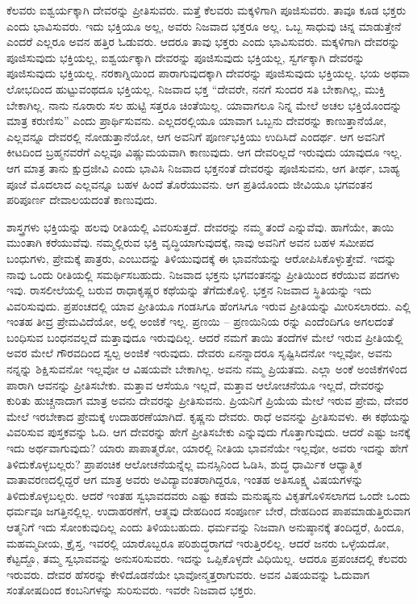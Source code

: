 ಕೆಲವರು ಐಶ್ವರ್ಯಕ್ಕಾಗಿ ದೇವರನ್ನು ಪ್ರೀತಿಸುವರು. ಮತ್ತೆ ಕೆಲವರು ಮಕ್ಕಳಿಗಾಗಿ ಪೂಜಿಸುವರು. ತಾವೂ ಕೂಡ ಭಕ್ತರು ಎಂದು ಭಾವಿಸುವರು. ಇದು ಭಕ್ತಿಯೂ ಅಲ್ಲ, ಅವರು ನಿಜವಾದ ಭಕ್ತರೂ ಅಲ್ಲ. ಒಬ್ಬ ಸಾಧುವು ಚಿನ್ನ ಮಾಡುತ್ತೇನೆ ಎಂದರೆ ಎಲ್ಲರೂ ಅವನ ಹತ್ತಿರ ಓಡುವರು. ಆದರೂ ತಾವು ಭಕ್ತರು ಎಂದು ಭಾವಿಸುವರು. ಮಕ್ಕಳಿಗಾಗಿ ದೇವರನ್ನು ಪೂಜಿಸುವುದು ಭಕ್ತಿಯಲ್ಲ, ಐಶ್ವರ್ಯಕ್ಕಾಗಿ ದೇವರನ್ನು ಪೂಜಿಸುವುದು ಭಕ್ತಿಯಲ್ಲ, ಸ್ವರ್ಗಕ್ಕಾಗಿ ದೇವರನ್ನು ಪೂಜಿಸುವುದು ಭಕ್ತಿಯಲ್ಲ. ನರಕಾಗ್ನಿಯಿಂದ ಪಾರಾಗುವುದಕ್ಕಾಗಿ ದೇವರನ್ನು ಪೂಜಿಸುವುದು ಭಕ್ತಿಯಲ್ಲ. ಭಯ ಅಥವಾ ಲೋಭದಿಂದ ಹುಟ್ಟುವಂಥದೂ ಭಕ್ತಿಯಲ್ಲ. ನಿಜವಾದ ಭಕ್ತ “ದೇವರೇ, ನನಗೆ ಸುಂದರ ಸತಿ ಬೇಕಾಗಿಲ್ಲ, ಮುಕ್ತಿ ಬೇಕಾಗಿಲ್ಲ. ನಾನು ನೂರಾರು ಸಲ ಹುಟ್ಟಿ ಸತ್ತರೂ ಚಿಂತೆಯಿಲ್ಲ. ಯಾವಾಗಲೂ ನಿನ್ನ ಮೇಲೆ ಅಚಲ ಭಕ್ತಿಯೊಂದನ್ನು ಮಾತ್ರ ಕರುಣಿಸು” ಎಂದು ಪ್ರಾರ್ಥಿಸುವನು. ಎಲ್ಲದರಲ್ಲಿಯೂ ಯಾವಾಗ ಒಬ್ಬನು ದೇವರನ್ನು ಕಾಣುತ್ತಾನೆಯೋ, ಎಲ್ಲವನ್ನೂ ದೇವರಲ್ಲಿ ನೋಡುತ್ತಾನೆಯೋ, ಆಗ ಅವನಿಗೆ ಪೂರ್ಣಭಕ್ತಿಯು ಉದಿಸಿದೆ ಎಂದರ್ಥ. ಆಗ ಅವನಿಗೆ ಕೀಟದಿಂದ ಬ್ರಹ್ಮನವರೆಗೆ ಎಲ್ಲವೂ ವಿಷ್ಣುಮಯವಾಗಿ ಕಾಣುವುದು. ಆಗ ದೇವರಿಲ್ಲದೆ ಇರುವುದು ಯಾವುದೂ ಇಲ್ಲ. ಆಗ ಮಾತ್ರ ತಾನು ಕ್ಷುದ್ರಜೀವಿ ಎಂದು ಭಾವಿಸಿ ನಿಜವಾದ ಭಕ್ತನಂತೆ ದೇವರನ್ನು ಪೂಜಿಸುವನು, ಆಗ ತೀರ್ಥ, ಬಾಹ್ಯ ಪೂಜೆ ಮೊದಲಾದ ಎಲ್ಲವನ್ನೂ ಬಹಳ ಹಿಂದೆ ತೊರೆಯುವನು. ಆಗ ಪ್ರತಿಯೊಂದು ಜೀವಿಯೂ ಭಗವಂತನ ಪರಿಪೂರ್ಣ ದೇವಾಲಯದಂತೆ ಕಾಣುವುದು.

ಶಾಸ್ತ್ರಗಳು ಭಕ್ತಿಯನ್ನು ಹಲವು ರೀತಿಯಲ್ಲಿ ವಿವರಿಸುತ್ತದೆ. ದೇವರನ್ನು ನಮ್ಮ ತಂದೆ ಎನ್ನುವೆವು. ಹಾಗೆಯೇ, ತಾಯಿ ಮುಂತಾಗಿ ಕರೆಯುವೆವು. ನಮ್ಮಲ್ಲಿರುವ ಭಕ್ತಿ ವೃದ್ಧಿಯಾಗುವುದಕ್ಕೆ, ನಾವು ಅವನಿಗೆ ಅವನ ಬಹಳ ಸಮೀಪದ ಬಂಧುಗಳು, ಪ್ರೇಮಕ್ಕೆ ಪಾತ್ರರು, ಎಂಬುದನ್ನು ತಿಳಿಯುವುದಕ್ಕೆ ಈ ಭಾವನೆಯನ್ನು ಆರೋಪಿಸಿಕೊಳ್ಳುತ್ತೇವೆ. ಇದನ್ನು ನಾವು ಒಂದು ರೀತಿಯಲ್ಲಿ ಸಮರ್ಥಿಸಬಹುದು. ನಿಜವಾದ ಭಕ್ತನು ಭಗವಂತನನ್ನು ಪ್ರೀತಿಯಿಂದ ಕರೆಯುವ ಪದಗಳು ಇವು. ರಾಸಲೀಲೆಯಲ್ಲಿ ಬರುವ ರಾಧಾಕೃಷ್ಣರ ಕಥೆಯನ್ನು ತೆಗೆದುಕೊಳ್ಳಿ. ಭಕ್ತನ ನಿಜವಾದ ಸ್ಥಿತಿಯನ್ನು ಇದು ವಿವರಿಸುವುದು. ಪ್ರಪಂಚದಲ್ಲಿ ಯಾವ ಪ್ರೀತಿಯೂ ಗಂಡಸಿಗೂ ಹೆಂಗಸಿಗೂ ಇರುವ ಪ್ರೀತಿಯನ್ನು ಮೀರಿಸಲಾರದು. ಎಲ್ಲಿ ಇಂತಹ ತೀವ್ರ ಪ್ರೇಮವಿದೆಯೋ, ಅಲ್ಲಿ ಅಂಜಿಕೆ ಇಲ್ಲ. ಪ್ರಣಯಿ – ಪ್ರಣಯಿನಿಯ ರನ್ನು ಎಂದೆಂದಿಗೂ ಅಗಲದಂತೆ ಬಂಧಿಸುವ ಬಂಧನವಲ್ಲದೆ ಮತ್ತಾವುದೂ ಇರುವುದಿಲ್ಲ. ಆದರೆ ನಮಗೆ ತಾಯಿ ತಂದೆಗಳ ಮೇಲೆ ಇರುವ ಪ್ರೀತಿಯಲ್ಲಿ ಅವರ ಮೇಲೆ ಗೌರವದಿಂದ ಸ್ವಲ್ಪ ಅಂಜಿಕೆ ಇರುವುದು. ದೇವರು ಏನನ್ನಾದರೂ ಸೃಷ್ಟಿಸಿದನೋ ಇಲ್ಲವೋ, ಅವನು ನನ್ನನ್ನು ಶಿಕ್ಷಿಸುವನೋ ಇಲ್ಲವೋ ಆ ವಿಷಯವೇ ಬೇಕಾಗಿಲ್ಲ. ಅವನು ನಮ್ಮ ಪ್ರಿಯತಮ. ಎಲ್ಲಾ ಅಂಕೆ ಅಂಜಿಕೆಗಳಿಂದ ಪಾರಾಗಿ ಆವನನ್ನು ಪ್ರೀತಿಸಬೇಕು. ಮತ್ತಾವ ಆಸೆಯೂ ಇಲ್ಲದೆ, ಮತ್ತಾವ ಆಲೋಚನೆಯೂ ಇಲ್ಲದೆ, ದೇವರನ್ನು ಕುರಿತು ಹುಚ್ಚನಾದಾಗ ಮಾತ್ರ ಅವನು ದೇವರನ್ನು ಪ್ರೀತಿಸುವನು. ಪ್ರಿಯನಿಗೆ ಪ್ರಿಯೆಯ ಮೇಲೆ ಇರುವ ಪ್ರೇಮ, ದೇವರ ಮೇಲೆ ಇರಬೇಕಾದ ಪ್ರೇಮಕ್ಕೆ ಉದಾಹರಣೆಯಾಗಿದೆ. ಕೃಷ್ಣನು ದೇವರು. ರಾಧೆ ಅವನನ್ನು ಪ್ರೀತಿಸುವಳು. ಈ ಕಥೆಯನ್ನು ವಿವರಿಸುವ ಪುಸ್ತಕವನ್ನು ಓದಿ. ಆಗ ದೇವರನ್ನು ಹೇಗೆ ಪ್ರೀತಿಸಬೇಕು ಎನ್ನುವುದು ಗೊತ್ತಾಗುವುದು. ಆದರೆ ಎಷ್ಟು ಜನಕ್ಕೆ ಇದು ಅರ್ಥವಾಗುವುದು? ಯಾರು ಪಾಪಾತ್ಮರೋ, ಯಾರಲ್ಲಿ ನೀತಿಯ ಭಾವನೆಯೇ ಇಲ್ಲವೋ, ಅವರು ಇದನ್ನು ಹೇಗೆ ತಿಳಿದುಕೊಳ್ಳಬಲ್ಲರು? ಪ್ರಾಪಂಚಿಕ ಆಲೋಚನೆಯನ್ನೆಲ್ಲ ಮನಸ್ಸಿನಿಂದ ಓಡಿಸಿ, ಶುದ್ಧ ಧಾರ್ಮಿಕ ಆಧ್ಯಾತ್ಮಿಕ ವಾತಾವರಣದಲ್ಲಿದ್ದರೆ ಆಗ ಮಾತ್ರ ಅವರು ಅವಿದ್ಯಾವಂತರಾಗಿದ್ದರೂ, ಇಂತಹ ಅತಿಸೂಕ್ಷ್ಮ ವಿಷಯಗಳನ್ನು ತಿಳಿದುಕೊಳ್ಳಬಲ್ಲರು. ಆದರೆ ಇಂತಹ ಸ್ವಭಾವದವರು ಎಷ್ಟು ಕಡಮೆ ಮನುಷ್ಯನು ವಿಕೃತಗೊಳಿಸಲಾಗದ ಒಂದೇ ಒಂದು ಧರ್ಮವೂ ಜಗತ್ತಿನಲ್ಲಿಲ್ಲ. ಉದಾಹರಣೆಗೆ, ಆತ್ಮವು ದೇಹದಿಂದ ಸಂಪೂರ್ಣ ಬೇರೆ, ದೇಹದಿಂದ ಪಾಪಮಾಡುತ್ತಿರುವಾಗ ಆತ್ಮನಿಗೆ ಇದು ಸೋಂಕುವುದಿಲ್ಲ ಎಂದು ತಿಳಿಯಬಹುದು. ಧರ್ಮವನ್ನು ನಿಜವಾಗಿ ಅನುಷ್ಠಾನಕ್ಕೆ ತಂದಿದ್ದರೆ, ಹಿಂದೂ, ಮಹಮ್ಮದೀಯ, ಕ್ರೈಸ್ತ, ಇವರಲ್ಲಿ ಯಾರೊಬ್ಬರೂ ಪರಿಶುದ್ಧರಾಗದೆ ಇರುತ್ತಿರಲಿಲ್ಲ. ಆದರೆ ಜನರು ಒಳ್ಳೆಯದೋ, ಕೆಟ್ಟದ್ದೊ, ತಮ್ಮ ಸ್ವಭಾವವನ್ನು ಅನುಸರಿಸುವರು. ಇದನ್ನು ಒಪ್ಪಿಕೊಳ್ಳದೇ ವಿಧಿಯಿಲ್ಲ. ಆದರೂ ಪ್ರಪಂಚದಲ್ಲಿ ಕೆಲವರು ಇರುವರು. ದೇವರ ಹೆಸರನ್ನು ಕೇಳಿದೊಡನೆಯೇ ಭಾವೋನ್ಮತ್ತರಾಗುವರು. ಅವನ ವಿಷಯವನ್ನು ಓದುವಾಗ ಸಂತೋಷದಿಂದ ಕಂಬನಿಗಳನ್ನು ಸುರಿಸುವರು. ಇವರೇ ನಿಜವಾದ ಭಕ್ತರು.

